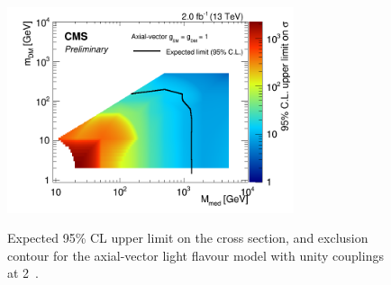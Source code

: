 
 
 
 



%
%



%
%


\begin{figure}
\begin{center}
\includegraphics[width=0.75\textwidth]{figures/DMplots/dm_A_g1p0_2p0fb_2dlimits.png} \\
\caption{Expected 95\% CL upper limit on the cross section, and exclusion
contour for the axial-vector light flavour model with unity couplings at 2~\ifb.}
\label{fig:dm_A_g1_2fb_2dlimits}
\end{center}
\end{figure}

